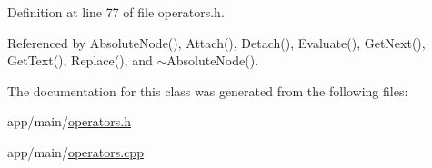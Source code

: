 Definition at line 77 of file operators.\+h.



Referenced by Absolute\+Node(), Attach(), Detach(), Evaluate(), Get\+Next(), Get\+Text(), Replace(), and $\sim$\+Absolute\+Node().



The documentation for this class was generated from the following files\+:\begin{DoxyCompactItemize}
\item 
app/main/\hyperlink{operators_8h}{operators.\+h}\item 
app/main/\hyperlink{operators_8cpp}{operators.\+cpp}\end{DoxyCompactItemize}
